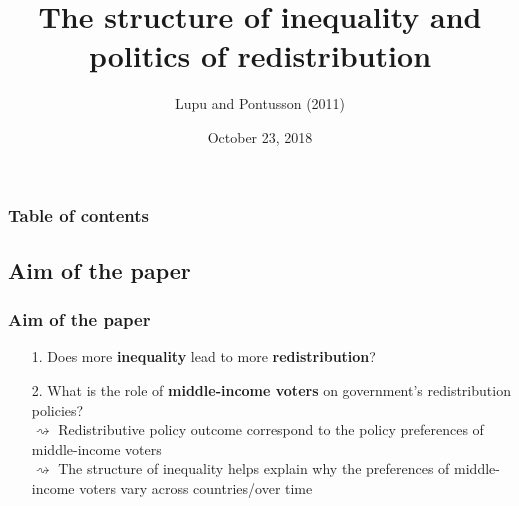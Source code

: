 \documentclass{beamer}
\title[discussant Filippo Teoldi]{The structure of inequality and politics of redistribution} %
\author{Lupu and Pontusson (2011)} %
\institute[] %
{
Discussion by \\ Julian Enrique Gerez, Zara Riaz \& Filippo Teoldi \\ %
\medskip
\textit{} %
}
\date{October 23, 2018} %
\begin{document}
\begin{frame}
\titlepage %
\end{frame}





\begin{frame}
\frametitle{Table of contents} %
\tableofcontents %
\end{frame}
\begin{frame}


\subsection{Aim of the paper}
\frametitle{Aim of the paper}
\begin{itemize}
\item [1.] Does more \textbf{inequality} lead to more \textbf{redistribution}? \\
\medskip
\item[2.] What is the role of \textbf{middle-income voters} on government's redistribution policies?\\
\medskip
$\rightsquigarrow$ Redistributive policy outcome correspond to the policy preferences of middle-income voters\\
\medskip
$\rightsquigarrow$ The structure of inequality helps explain why the preferences of middle-income voters vary across countries/over time

\end{itemize}
\end{frame}
\end{document}
